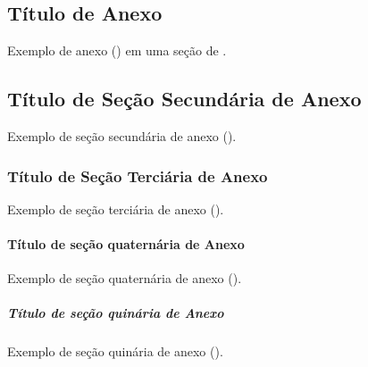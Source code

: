 \begin{Annex}

\section{Título de Anexo}%
\label{sect:anx-a1}

Exemplo de anexo () em uma seção de .

\subsection{Título de Seção Secundária de Anexo}%
\label{ssect:anx-a2}

Exemplo de seção secundária de anexo ().

\subsubsection{Título de Seção Terciária de Anexo}%
\label{sssect:anx-a3}

Exemplo de seção terciária de anexo ().

\paragraph{Título de seção quaternária de Anexo}%
\label{prgh:anx-a4}

Exemplo de seção quaternária de anexo ().

\subparagraph{Título de seção quinária de Anexo}%
\label{sprgh:anx-a5}

Exemplo de seção quinária de anexo ().

\end{Annex}
